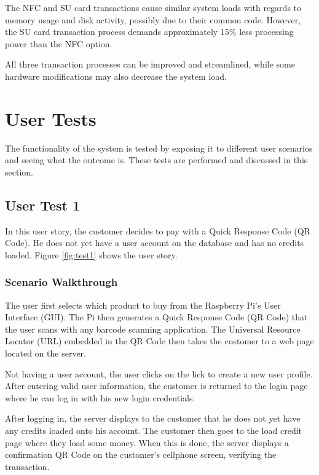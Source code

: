 The NFC and SU card transactions cause similar system loads with regards to memory usage
and disk activity, possibly due to their common code. However, the SU card transaction
process demands approximately 15\% less processing power than the NFC option. 

All three transaction processes can be improved and streamlined, while some hardware
modifications may also decrease the system load. 

\section{User Tests}

The functionality of the system is tested by exposing it to different user scenarios and
seeing what the outcome is. These tests are performed and discussed in this section.

\subsection{User Test 1}

In this user story, the customer decides to pay with a Quick Response Code (QR Code).
He does not yet have a user account on the database and has no credits loaded.
Figure \ref{fig:test1} shows the user story. 

\subsubsection{Scenario Walkthrough}

The user first selects which product to buy from the Raspberry
Pi's User Interface (GUI). The Pi then generates a Quick Response Code (QR Code) that the
user scans with any barcode scanning application. The Universal Resource Locator (URL)
embedded in the QR Code then takes the customer to a web page located on the server. 

Not having a user account, the user clicks on the lick to create a new user profile. After
entering valid user information, the customer is returned to the login  page where he
can log in with his new login credentials. 

After logging in, the server displays to the customer that he does not yet have any
credits loaded onto his account. The customer then goes to the load credit page where
they load some money. When this is done, the server displays a confirmation QR Code on
the customer's cellphone screen, verifying the transaction.

